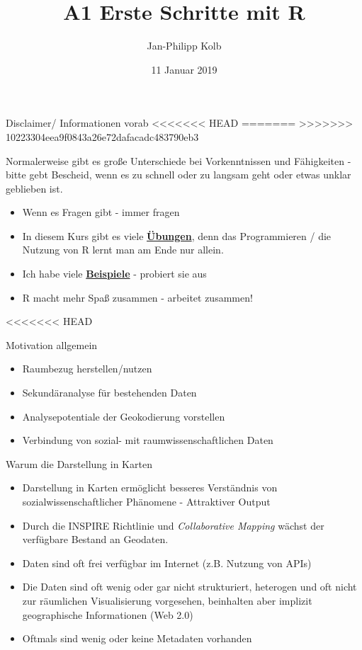 \documentclass[ignorenonframetext,]{beamer}
\title{A1 Erste Schritte mit R}
\author{Jan-Philipp Kolb}
\date{11 Januar 2019}
\providecommand{\tightlist}{%
  \setlength{\itemsep}{0pt}\setlength{\parskip}{0pt}}
\begin{document}
\frame{\titlepage}

\begin{frame}{Disclaimer/ Informationen vorab}
<<<<<<< HEAD
=======
\protect\hypertarget{disclaimer-informationen-vorab}{}
>>>>>>> 10223304eea9f0843a26e72dafacadc483790eb3

Normalerweise gibt es große Unterschiede bei Vorkenntnissen und
Fähigkeiten - bitte gebt Bescheid, wenn es zu schnell oder zu langsam
geht oder etwas unklar geblieben ist.

\begin{itemize}
\tightlist
\item
  Wenn es Fragen gibt - immer fragen
\item
  In diesem Kurs gibt es viele
  \href{http://web.math.ku.dk/~helle/R-intro/exercises.pdf}{\textbf{Übungen}},
  denn das Programmieren / die Nutzung von R lernt man am Ende nur
  allein.
\item
  Ich habe viele \href{https://www.showmeshiny.com/}{\textbf{Beispiele}}
  - probiert sie aus
\item
  R macht mehr Spaß zusammen - arbeitet zusammen!
\end{itemize}

<<<<<<< HEAD
\begin{block}{Motivation allgemein}

\begin{itemize}
\tightlist
\item
  Raumbezug herstellen/nutzen
\item
  Sekundäranalyse für bestehenden Daten
\item
  Analysepotentiale der Geokodierung vorstellen
\item
  Verbindung von sozial- mit raumwissenschaftlichen Daten
\end{itemize}

\end{block}

\begin{block}{Warum die Darstellung in Karten}

\begin{itemize}
\item
  Darstellung in Karten ermöglicht besseres Verständnis von
  sozialwissenschaftlicher Phänomene - Attraktiver Output
\item
  Durch die INSPIRE Richtlinie und \emph{Collaborative Mapping} wächst
  der verfügbare Bestand an Geodaten.
\item
  Daten sind oft frei verfügbar im Internet (z.B. Nutzung von APIs)
\item
  Die Daten sind oft wenig oder gar nicht strukturiert, heterogen und
  oft nicht zur räumlichen Visualisierung vorgesehen, beinhalten aber
  implizit geographische Informationen (Web 2.0)
\item
  Oftmals sind wenig oder keine Metadaten vorhanden
\end{itemize}

\end{block}

\end{frame}
\end{document}
